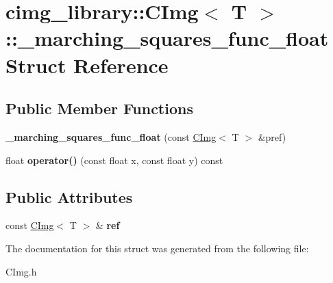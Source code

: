 \hypertarget{structcimg__library_1_1_c_img_1_1__marching__squares__func__float}{\section{cimg\-\_\-library\-:\-:C\-Img$<$ T $>$\-:\-:\-\_\-marching\-\_\-squares\-\_\-func\-\_\-float Struct Reference}
\label{structcimg__library_1_1_c_img_1_1__marching__squares__func__float}
}
\subsection*{Public Member Functions}
\begin{DoxyCompactItemize}
\item 
\hypertarget{structcimg__library_1_1_c_img_1_1__marching__squares__func__float_a123194ace14b163ff599442b33e46ef9}{{\bfseries \-\_\-marching\-\_\-squares\-\_\-func\-\_\-float} (const \hyperlink{structcimg__library_1_1_c_img}{C\-Img}$<$ T $>$ \&pref)}\label{structcimg__library_1_1_c_img_1_1__marching__squares__func__float_a123194ace14b163ff599442b33e46ef9}

\item 
\hypertarget{structcimg__library_1_1_c_img_1_1__marching__squares__func__float_a67f832549419a9cae2815bb74dd2564e}{float {\bfseries operator()} (const float x, const float y) const }\label{structcimg__library_1_1_c_img_1_1__marching__squares__func__float_a67f832549419a9cae2815bb74dd2564e}

\end{DoxyCompactItemize}
\subsection*{Public Attributes}
\begin{DoxyCompactItemize}
\item 
\hypertarget{structcimg__library_1_1_c_img_1_1__marching__squares__func__float_a0073b957a8eb58145a58d89619383596}{const \hyperlink{structcimg__library_1_1_c_img}{C\-Img}$<$ T $>$ \& {\bfseries ref}}\label{structcimg__library_1_1_c_img_1_1__marching__squares__func__float_a0073b957a8eb58145a58d89619383596}

\end{DoxyCompactItemize}


The documentation for this struct was generated from the following file\-:\begin{DoxyCompactItemize}
\item 
C\-Img.\-h\end{DoxyCompactItemize}
